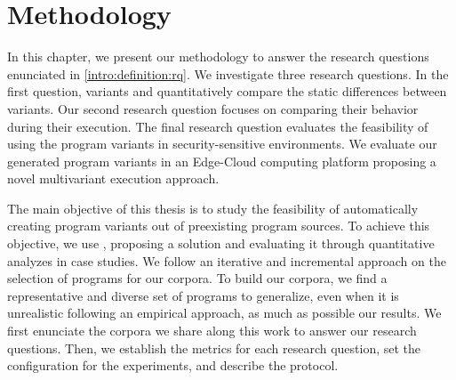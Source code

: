 \chapter{Methodology} 
\label{chapter:method}

\pagestyle{plain}
\newcommand{\libsodiumfunctions}{869}
\newcommand{\qrcodefunctions}{1849}
\newcommand{\allmewefunctions}{\libsodiumfunctions + \qrcodefunctions}

\newcommand{\py}[1]{}
\newcommand{\fromjson}[2]{}

\newcommand{\corpusrosetta}{\fromjson{data/crow_corpus.json}{.[0].name}}
\newcommand{\corpussodium}{Libsodium\xspace}
\newcommand{\corpusqrcode}{QrCode\xspace}


\newcommand{\DTWStatic}{dt\_static\xspace}
\newcommand{\DTW}{TraceDiff\xspace}
\newcommand{\tool}{CROW\xspace}


In this chapter, we present our methodology to answer the research questions enunciated in \autoref{intro:definition:rq}.
We investigate three research questions. In the first question,   variants and quantitatively compare the static differences between variants. 
Our second research question focuses on comparing their behavior during their execution.
The final research question evaluates the feasibility of using the program variants in security-sensitive environments. We evaluate our generated program variants in an Edge-Cloud computing platform proposing a novel multivariant execution approach.

The main objective of this thesis is to study the feasibility of automatically creating program variants out of preexisting program sources. To achieve this objective,
we use , proposing a solution and evaluating it through quantitative analyzes in case studies. We follow an iterative and incremental approach on the selection of programs for our corpora. To build our corpora, we find a representative and diverse set of programs to generalize, even when it is unrealistic following an empirical approach, as much as possible our results.
We first enunciate the corpora we share along this work to answer our research questions. Then, we establish the metrics for each research question, set the configuration for the experiments, and describe the protocol.

